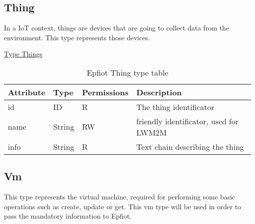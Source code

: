\subsection{Thing}
\label{makereference5.1.3}
In a IoT context, things are devices that are going to collect data from the environment. This type represents those devices.

\underline{Type Things}
\begin{table}[H]
\begin{center}
\begin{tabular}[b]{|l|l|l|p{11cm}|}
    \hline
    Attribute & Type & Permissions & Description \\
    \hline
    id & ID & R & The thing identificator \\
    \hline
    name & String & RW & friendly identificator, used for LWM2M\\
    \hline
    info & String & R & Text chain describing the thing\\
    \hline
\end{tabular}
\caption{Epfiot Thing type table}
\label{table1}
\end{center}
\end{table}

\subsection{Vm}
\label{makereference5.1.4}

This type represents the virtual machine, required for performing some basic operations such as create, update or get. This vm type will be used in order to pass the mandatory information to Epfiot.

